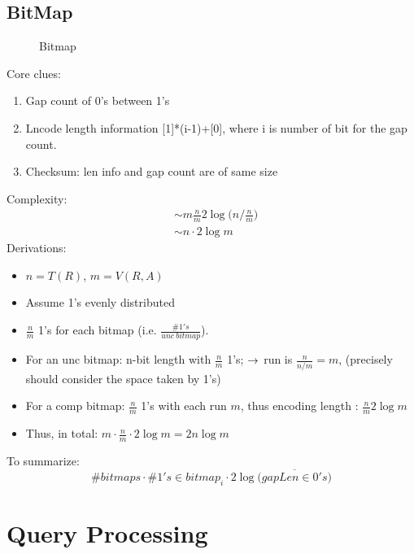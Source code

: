 \documentclass[a4paper]{report}
\begin{document}
\section{BitMap}
\begin{figure}[H]
\centering
{}
\caption{Bitmap}
\label{fig:LABEL}
\end{figure}
Core clues:
\begin{enumerate}
\item Gap count of 0's between 1's
\item Lncode length information [1]*(i-1)+[0], where i is number of bit for the gap count.
\item Checksum: len info and gap count are of same size
\end{enumerate}
Complexity: 
\begin{align*}
& \sim m \frac{n}{m} 2\log\Big(n/\frac{n}{m} \Big) \\
& \sim n \cdot 2\log m 
\end{align*}
Derivations:
\begin{itemize}
\item $n = T(R)$, $m = V(R, A)$
\item Assume 1's evenly distributed 
\item $\frac{n}{m}$ 1's for each bitmap (i.e. $\frac{\#1's}{unc\ bitmap}$).
\item For an unc bitmap: n-bit length with $\frac{n}{m}$ 1's; $\rightarrow$ run is $\frac{n}{n/m}=m$, (precisely should consider the space taken by 1's)
\item For a comp bitmap: $\frac{n}{m}$ 1's with each run $m$, thus encoding length : $\frac{n}{m} 2 \log m$
\item Thus, in total: $m \cdot \frac{n}{m} \cdot 2 \log{m} = 2n\log m$
\end{itemize}

To summarize: 
$$
\#bitmaps \cdot \#1's\in bitmap_i \cdot 2\log\Big(\overline{gapLen\in 0's}\Big)
$$


\chapter{Query Processing}
\end{document}
